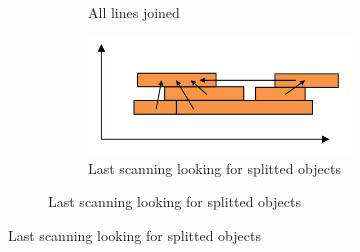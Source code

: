 \begin{figure}
\begin{subfigure}{\linewidth}
\begin{subfigure}{0.4\linewidth}
   			\caption{All lines joined}
   			\label{fig:RLE3}
   		\end{subfigure}
   		\begin{subfigure}{0.4\linewidth}
   			\includegraphics[width=\linewidth]{../Images/c2/RLE4}
   			\caption{Last scanning looking for splitted objects}
   			\label{fig:RLE4}
   		\end{subfigure}
	\end{subfigure}
\end{figure}
